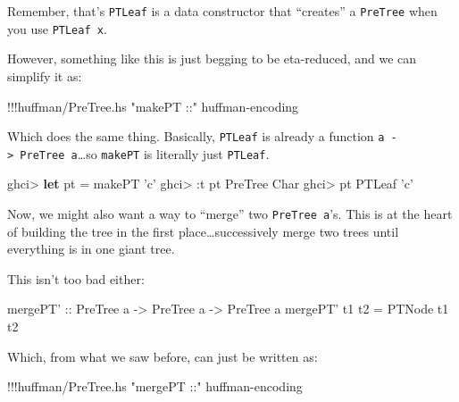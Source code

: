 \documentclass[]{article}
\newenvironment{Shaded}{}{}
\newcommand{\KeywordTok}[1]{\textcolor[rgb]{0.00,0.44,0.13}{\textbf{{#1}}}}
\newcommand{\DataTypeTok}[1]{\textcolor[rgb]{0.56,0.13,0.00}{{#1}}}
\newcommand{\CharTok}[1]{\textcolor[rgb]{0.25,0.44,0.63}{{#1}}}
\newcommand{\StringTok}[1]{\textcolor[rgb]{0.25,0.44,0.63}{{#1}}}
\newcommand{\OtherTok}[1]{\textcolor[rgb]{0.00,0.44,0.13}{{#1}}}
\newcommand{\FunctionTok}[1]{\textcolor[rgb]{0.02,0.16,0.49}{{#1}}}
\newcommand{\NormalTok}[1]{{#1}}
\begin{document}
Remember, that's \texttt{PTLeaf} is a data constructor that ``creates''
a \texttt{PreTree} when you use \texttt{PTLeaf\ x}.

However, something like this is just begging to be eta-reduced, and we
can simplify it as:

\begin{Shaded}
\begin{Highlighting}[]
\FunctionTok{!!!}\NormalTok{huffman}\FunctionTok{/}\NormalTok{PreTree.hs }\StringTok{"makePT ::"} \NormalTok{huffman}\FunctionTok{-}\NormalTok{encoding}
\end{Highlighting}
\end{Shaded}

Which does the same thing. Basically, \texttt{PTLeaf} is already a
function \texttt{a\ -\textgreater{}\ PreTree\ a}\ldots{}so
\texttt{makePT} is literally just \texttt{PTLeaf}.

\begin{Shaded}
\begin{Highlighting}[]
\NormalTok{ghci}\FunctionTok{>} \KeywordTok{let} \NormalTok{pt }\FunctionTok{=} \NormalTok{makePT }\CharTok{'c'}
\NormalTok{ghci}\FunctionTok{>} \FunctionTok{:}\NormalTok{t pt}
\DataTypeTok{PreTree} \DataTypeTok{Char}
\NormalTok{ghci}\FunctionTok{>} \NormalTok{pt}
\DataTypeTok{PTLeaf} \CharTok{'c'}
\end{Highlighting}
\end{Shaded}

Now, we might also want a way to ``merge'' two \texttt{PreTree\ a}'s.
This is at the heart of building the tree in the first
place\ldots{}successively merge two trees until everything is in one
giant tree.

This isn't too bad either:

\begin{Shaded}
\begin{Highlighting}[]
\OtherTok{mergePT' ::} \DataTypeTok{PreTree} \NormalTok{a }\OtherTok{->} \DataTypeTok{PreTree} \NormalTok{a }\OtherTok{->} \DataTypeTok{PreTree} \NormalTok{a}
\NormalTok{mergePT' t1 t2 }\FunctionTok{=} \DataTypeTok{PTNode} \NormalTok{t1 t2}
\end{Highlighting}
\end{Shaded}

Which, from what we saw before, can just be written as:

\begin{Shaded}
\begin{Highlighting}[]
\FunctionTok{!!!}\NormalTok{huffman}\FunctionTok{/}\NormalTok{PreTree.hs }\StringTok{"mergePT ::"} \NormalTok{huffman}\FunctionTok{-}\NormalTok{encoding}
\end{Highlighting}
\end{Shaded}
\end{document}
